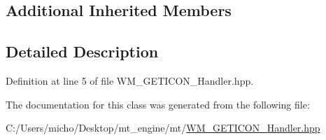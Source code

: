 \subsection*{Additional Inherited Members}


\subsection{Detailed Description}


Definition at line 5 of file W\+M\+\_\+\+G\+E\+T\+I\+C\+O\+N\+\_\+\+Handler.\+hpp.



The documentation for this class was generated from the following file\+:\begin{DoxyCompactItemize}
\item 
C\+:/\+Users/micho/\+Desktop/mt\+\_\+engine/mt/\hyperlink{_w_m___g_e_t_i_c_o_n___handler_8hpp}{W\+M\+\_\+\+G\+E\+T\+I\+C\+O\+N\+\_\+\+Handler.\+hpp}\end{DoxyCompactItemize}
